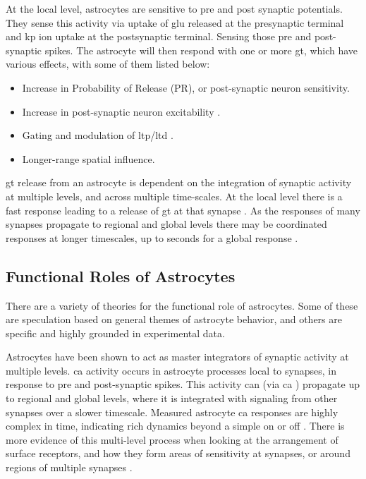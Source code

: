 \documentclass[conference]{IEEEtran}
\newcommand{\ca}{\gls{ca}\textrm{ }}
\newcommand{\kp}{\gls{kp}\textrm{ }}
\begin{document}
At the local level, astrocytes are sensitive to pre and post synaptic
potentials. They sense this activity via uptake of \gls{glu} released at the
presynaptic terminal and \kp ion uptake at the postsynaptic terminal. Sensing
those pre and post-synaptic spikes. The astrocyte will then respond with one or
more \gls{gt}, which have various effects, with some of them listed below:

\begin{itemize}
\item Increase in Probability of Release (PR), or post-synaptic neuron
  sensitivity.
\item Increase in post-synaptic neuron excitability \parencite{chung_2015}.
\item Gating and modulation of \gls{ltp}/\gls{ltd} \parencite{mederos_2018}.
\item Longer-range spatial influence.
\end{itemize}

\Gls{gt} release from an astrocyte is dependent on the integration of synaptic
activity at multiple levels, and across multiple time-scales. At the local level
there is a fast response leading to a release of \gls{gt} at that synapse
\parencite{pitta_2016}. As the responses of many synapses propagate to regional
and global levels there may be coordinated responses at longer timescales, up to
seconds for a global response \parencite{mederos_2018}.


\subsection{Functional Roles of Astrocytes}

There are a variety of theories for the functional role of astrocytes.
Some of these are speculation based on general themes of astrocyte behavior,
and others are specific and highly grounded in experimental data.

Astrocytes have been shown to act as master integrators of synaptic activity at
multiple levels. \ca activity occurs in astrocyte processes local to synapses,
in response to pre and post-synaptic spikes. This activity can (via \ca)
propagate up to regional and global levels, where it is integrated with
signaling from other synapses over a slower timescale. Measured astrocyte \ca
responses are highly complex in time, indicating rich dynamics beyond a simple
on or off \parencite{araque_2014}. There is more evidence of this multi-level
process when looking at the arrangement of surface receptors, and how they form
areas of sensitivity at synapses, or around regions of multiple synapses
\parencite{pitta_2012}.
\end{document}
